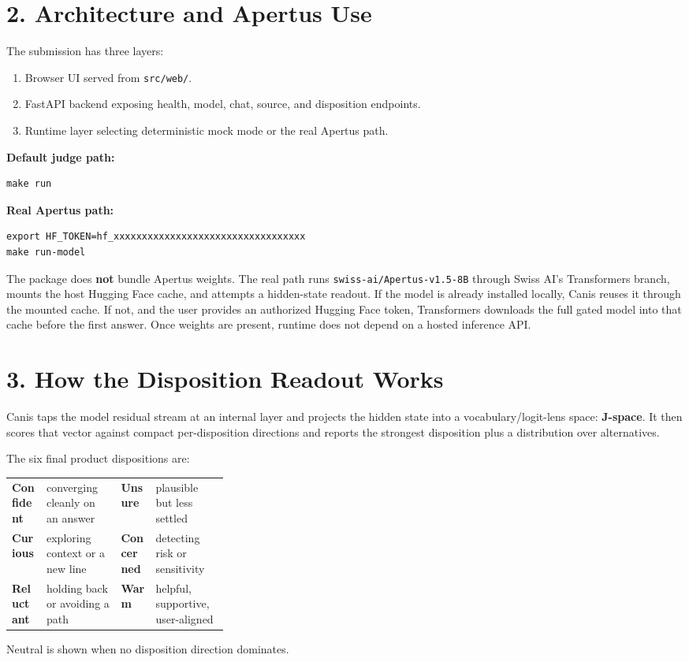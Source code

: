 \documentclass[10pt,a4paper]{article}
\newcommand{\sectionrule}{\vspace{-2pt}{\color{canisLine}\hrule}\vspace{4pt}}
\begin{document}
\section*{2. Architecture and Apertus Use}
\sectionrule
The submission has three layers:
\begin{enumerate}
\item Browser UI served from \texttt{src/web/}.
\item FastAPI backend exposing health, model, chat, source, and disposition endpoints.
\item Runtime layer selecting deterministic mock mode or the real Apertus path.
\end{enumerate}

\textbf{Default judge path:}
\begin{verbatim}
make run
\end{verbatim}

\textbf{Real Apertus path:}
\begin{verbatim}
export HF_TOKEN=hf_xxxxxxxxxxxxxxxxxxxxxxxxxxxxxxxxxx
make run-model
\end{verbatim}

The package does \textbf{not} bundle Apertus weights. The real path runs \texttt{swiss-ai/Apertus-v1.5-8B} through Swiss AI's Transformers branch, mounts the host Hugging Face cache, and attempts a hidden-state readout. If the model is already installed locally, Canis reuses it through the mounted cache. If not, and the user provides an authorized Hugging Face token, Transformers downloads the full gated model into that cache before the first answer. Once weights are present, runtime does not depend on a hosted inference API.

\section*{3. How the Disposition Readout Works}
\sectionrule
Canis taps the model residual stream at an internal layer and projects the hidden state into a vocabulary/logit-lens space: \textbf{J-space}. It then scores that vector against compact per-disposition directions and reports the strongest disposition plus a distribution over alternatives.

The six final product dispositions are:
\begin{center}
\begin{tabularx}{0.96\linewidth}{@{}p{0.16\linewidth}X p{0.16\linewidth}X@{}}
\textbf{Confident} & converging cleanly on an answer & \textbf{Unsure} & plausible but less settled \\
\textbf{Curious} & exploring context or a new line & \textbf{Concerned} & detecting risk or sensitivity \\
\textbf{Reluctant} & holding back or avoiding a path & \textbf{Warm} & helpful, supportive, user-aligned \\
\end{tabularx}
\end{center}
Neutral is shown when no disposition direction dominates.
\end{document}
